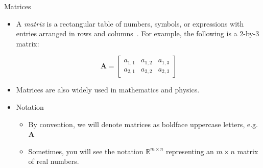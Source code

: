 \documentclass[aspectratio=169,xcolor=dvipsnames]{beamer}
\begin{document}
\begin{frame}{Matrices}

\begin{itemize}
      \item A \textit{matrix} is a rectangular table of numbers, symbols, or expressions
      with entries arranged in rows and columns~\cite{Wikipedia_Matrix_2025}. For
      example, the following is a 2-by-3 matrix: 
      
      $$\mathbf{A} = 
      \begin{bmatrix}
        a_{1,1} & a_{1,2} & a_{1,3} \\
        a_{2,1} & a_{2,2} & a_{2,3}
      \end{bmatrix}$$
      \item Matrices are also widely used in mathematics and physics.
      \item Notation
            \begin{itemize}
                  \item By convention, we will denote matrices as boldface
                        uppercase letters, e.g. $\mathbf{A}$
                  \item Sometimes, you will see the notation $\mathbb{R}^{m\times n}$
                        representing an $m \times n$ matrix of real numbers.
            \end{itemize}
\end{itemize}

\end{frame}

\end{document}
